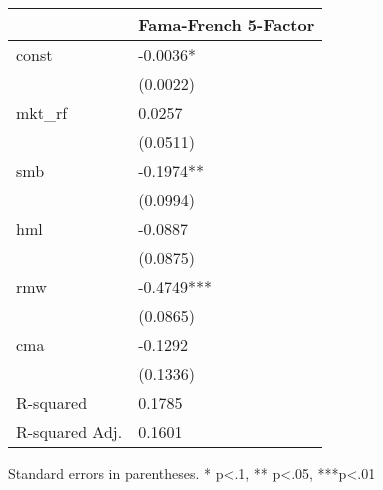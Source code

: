 \begin{table}
\caption{}
\label{}
\begin{center}
\begin{tabular}{ll}
\hline
               & Fama-French 5-Factor  \\
\hline
const          & -0.0036*              \\
               & (0.0022)              \\
mkt\_rf        & 0.0257                \\
               & (0.0511)              \\
smb            & -0.1974**             \\
               & (0.0994)              \\
hml            & -0.0887               \\
               & (0.0875)              \\
rmw            & -0.4749***            \\
               & (0.0865)              \\
cma            & -0.1292               \\
               & (0.1336)              \\
R-squared      & 0.1785                \\
R-squared Adj. & 0.1601                \\
\hline
\end{tabular}
\end{center}
\end{table}
\bigskip
Standard errors in parentheses. \newline 
* p<.1, ** p<.05, ***p<.01